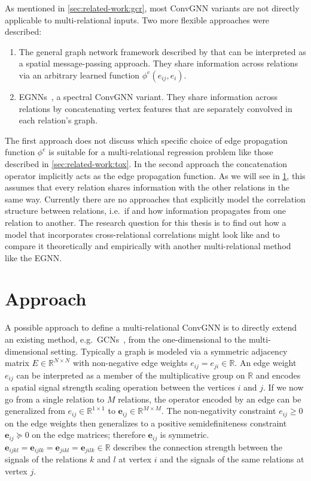 \documentclass[12pt]{scrartcl}
\begin{document}
As mentioned in \cref{sec:related-work:gcr}, most ConvGNN variants are not directly applicable to multi-relational inputs.
Two more flexible approaches were described:
\begin{enumerate}
	\item The general graph network framework described by \citet{Battaglia2018} that can be interpreted as a spatial message-passing approach.
		They share information across relations via an arbitrary learned function $\phi^e(e_{ij}, e_i)$.
	\item EGNNs~\cite{Gong2018}, a spectral ConvGNN variant.
		They share information across relations by concatenating vertex features that are separately convolved in each relation's graph.
\end{enumerate}
The first approach does not discuss which specific choice of edge propagation function $\phi^e$ is suitable for a multi-relational regression problem like those described in \cref{sec:related-work:tox}.
In the second approach the concatenation operator implicitly acts as the edge propagation function.
As we will see in \cref{sec:approach}, this assumes that every relation shares information with the other relations in the same way.
Currently there are no approaches that explicitly model the correlation structure between relations, i.e.\ if and how information propagates from one relation to another.
The research question for this thesis is to find out how a model that incorporates cross-relational correlations might look like and to compare it theoretically and empirically with another multi-relational method like the EGNN.\@

\section{Approach}%
\label{sec:approach}

A possible approach to define a multi-relational ConvGNN is to directly extend an existing method, e.g.\ GCNs~\cite{Kipf2017}, from the one-dimensional to the multi-dimensional setting.
Typically a graph is modeled via a symmetric adjacency matrix $E \in \mathbb{R}^{N \times N}$ with non-negative edge weights $e_{ij} = e_{ji} \in \mathbb{R}$.
An edge weight $e_{ij}$ can be interpreted as a member of the multiplicative group on $\mathbb{R}$ and encodes a spatial signal strength scaling operation between the vertices $i$ and $j$.
If we now go from a single relation to $M$ relations, the operator encoded by an edge can be generalized from $e_{ij} \in \mathbb{R}^{1 \times 1}$ to $\bm{e}_{ij} \in \mathbb{R}^{M \times M}$.
The non-negativity constraint $e_{ij} \geq 0$ on the edge weights then generalizes to a positive semidefiniteness constraint $\bm{e}_{ij} \succeq 0$ on the edge matrices; therefore $\bm{e}_{ij}$ is symmetric.
$\bm{e}_{ijkl} = \bm{e}_{ijlk} = \bm{e}_{jikl} = \bm{e}_{jilk} \in \mathbb{R}$ describes the connection strength between the signals of the relations $k$ and $l$ at vertex $i$ and the signals of the same relations at vertex $j$.
\end{document}
